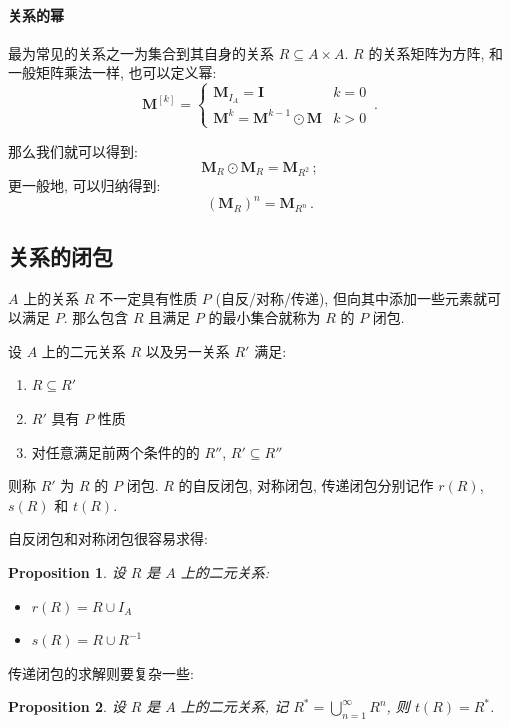 \documentclass[UTF8]{ctexart}
\theoremstyle{mystyle}
\newtheorem{proposition}{Proposition}[section]
\theoremstyle{myremark}
\theoremstyle{plain}
\newcommand{\ve}[1]{\boldsymbol{\mathbf{#1}}}
\begin{document}
\paragraph{关系的幂}
最为常见的关系之一为集合到其自身的关系 $ R \subseteq A \times A $. $ R $ 的关系矩阵为方阵, 和一般矩阵乘法一样, 也可以定义幂:
\[ \ve M^{[k]} = \begin{cases}
    \ve M_{I_A} = \ve I  & k = 0 \\
    \ve M^k = \ve M^{k - 1} \odot \ve M & k > 0
\end{cases} \,.\]

那么我们就可以得到:
\[ 
    \ve M_R \odot \ve M_R = \ve M_{R^2} \,;
\]
更一般地, 可以归纳得到:
\[ 
    (\ve M_R)^n = \ve M_{R^n} \,.
\]

\subsection{关系的闭包}
$ A $ 上的关系 $ R $ 不一定具有性质 $ P $ (自反/对称/传递), 但向其中添加一些元素就可以满足 $ P $. 那么包含 $ R $ 且满足 $ P $ 的最小集合就称为 $ R $ 的 $ P $ 闭包.

\begin{definition}[\text{闭包}]
    设 $ A $ 上的二元关系 $ R $ 以及另一关系 $ R' $ 满足:
    \begin{enumerate}
        \item $ R \subseteq R' $
        \item $ R' $ 具有 $ P $ 性质
        \item 对任意满足前两个条件的的 $ R'' $, $ R' \subseteq R'' $
    \end{enumerate}
    则称 $ R' $ 为 $ R $ 的 $ P $ 闭包. $ R $ 的自反闭包, 对称闭包, 传递闭包分别记作 $ r(R) $, $ s(R) $ 和 $ t(R) $.
\end{definition}

自反闭包和对称闭包很容易求得:
\begin{proposition}
    设 $ R $ 是 $ A $ 上的二元关系:
    \begin{itemize}
        \item $ r(R) = R \cup I_A $
        \item $ s(R) = R \cup R^{-1} $
    \end{itemize}
\end{proposition}

传递闭包的求解则要复杂一些:
\begin{proposition}
    设 $ R $ 是 $ A $ 上的二元关系, 记 $ R^* = \bigcup\limits_{n = 1}^{\infty} R^{n} $, 则 $ t(R) = R^* $.
\end{proposition}
\end{document}
